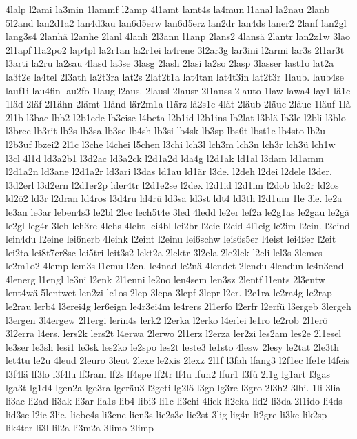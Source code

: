 {4lalp
l2ami
la3min
1lammf
l2amp
4l1amt
lamt4s
la4mun
l1anal
la2nau
2lanb
5l2and
lan2d1a2
lan4d3au
lan6d5erw
lan6d5erz
lan2dr
lan4ds
laner2
2lanf
lan2gl
lang3s4
2lanhä
l2anhe
2lanl
4lanli
2l3ann
l1anp
2lans2
4lansä
2lantr
lan2z1w
3lao
2l1apf
l1a2po2
lap4pl
la2r1an
la2r1ei
la4rene
3l2ar3g
lar3ini
l2armi
lar3s
2l1ar3t
l3arti
la2ru
la2sau
4lasd
la3se
3lasg
2lash
2lasi
la2so
2lasp
3lasser
last1o
lat2a
la3t2e
la4tel
2l3ath
la2t3ra
lat2s
2lat2t1a
lat4tan
lat4t3in
lat2t3r
1laub.
laub4se
lauf1i
lau4fin
lau2fo
1laug
l2aus.
2lausl
2lausr
2l1auss
2lauto
1law
lawa4
lay1
lä1c
1läd
2läf
2l1ähn
2lämt
1länd
lär2m1a
l1ärz
lä2s1c
4lät
2läub
2läuc
2läue
1läuf
1là
2l1b
l3bac
lbb2
l2b1ede
lb3eise
l4beta
l2b1id
l2b1ins
lb2lat
l3blä
lb3le
l2bli
l3blo
l3brec
lb3rit
lb2s
lb3sa
lb3se
lb4sh
lb3si
lb4sk
lb3sp
lbs6t
lbst1e
lb4sto
lb2u
l2b3uf
lbzei2
2l1c
l3che
l4chei
l5chen
l3chi
lch3l
lch3m
lch3n
lch3r
lch3ü
lch1w
l3cl
4l1d
ld3a2b1
l3d2ac
ld3a2ck
l2d1a2d
lda4g
l2d1ak
ld1al
l3dam
ld1amm
l2d1a2n
ld3ane
l2d1a2r
ld3ari
l3das
ld1au
ld1är
l3de.
l2deh
l2dei
l2dele
l3der.
l3d2erl
l3d2ern
l2d1er2p
lder4tr
l2d1e2se
l2dex
l2d1id
l2d1im
l2dob
ldo2r
ld2os
ld2ö2
ld3r
l2dran
ld4ros
l3d4ru
ld4rü
ld3sa
ld3st
ldt4
ld3th
l2d1um
1le
3le.
le2a
le3an
le3ar
leben4s3
le2bl
2lec
lech5t4e
3led
4ledd
le2er
lef2a
le2g1as
le2gau
le2gä
le2gl
leg4r
3leh
leh3re
4lehs
4leht
lei4bl
lei2br
l2eic
l2eid
4l1eig
le2im
l2ein.
l2eind
lein4du
l2eine
lei6nerb
4leink
l2eint
l2einu
lei6schw
leis6s5er
l4eist
lei4ßer
l2eit
lei2ta
lei8t7er8sc
lei5tri
leit3s2
lekt2a
2lektr
3l2ela
2le2lek
l2eli
lel3s
3lemes
le2m1o2
4lemp
lem3s
l1emu
l2en.
le4nad
le2nä
4lendet
2lendu
4lendun
le4n3end
4lenerg
l1engl
le3ni
l2enk
2l1enni
le2no
len4sem
len3sz
2lentf
l1ents
2l3entw
lent4wä
5lentwet
len2zi
le1os
2lep
3lepa
3lepf
3lepr
l2er.
l2e1ra
le2ra4g
le2rap
le2rau
lerb4
l3erei4g
ler6eign
le4r3ei4m
le4rers
2l1erfo
l2erfr
l2erfü
l3ergeb
3lergeh
l3ergen
3l4ergew
2l1ergi
lerin4s
lerk2
l2erka
l2erko
l4erlei
le1ro
le2rob
2l1erö
3l2erra
l4ers.
lers2k
lers2t
l4erwa
2lerwo
2l1erz
l2erza
ler2zi
les2am
les2e
2l1esel
le3ser
le3sh
lesi1
le3sk
les2ko
le2spo
les2t
leste3
le1sto
4lesw
2lesy
le2tat
2le3th
let4tu
le2u
4leud
2leuro
3leut
2lexe
le2xis
2lexz
2l1f
l3fah
lfang3
l2f1ec
lfe1e
l4feis
l3f4lä
lf3lo
l3f4lu
lf3ram
lf2s
lf4spe
lf2tr
lf4u
lfun2
lfur1
l3fü
2l1g
lg1art
l3gas
lga3t
lg1d4
lgen2a
lge3ra
lgeräu3
l2geti
lg2lö
l3go
lg3re
l3gro
2l3h2
3lhi.
1li
3lia
li3ac
li2ad
li3ak
li3ar
lia1s
lib4
libi3
li1c
li3chi
4lick
li2cka
lid2
li3da
2l1ido
li4ds
lid3sc
l2ie
3lie.
liebe4s
li3ene
lien3s
lie2s3c
lie2st
3lig
lig4n
li2gre
li3ke
lik2sp
lik4ter
li3l
lil2a
li3m2a
3limo
2limp
}
